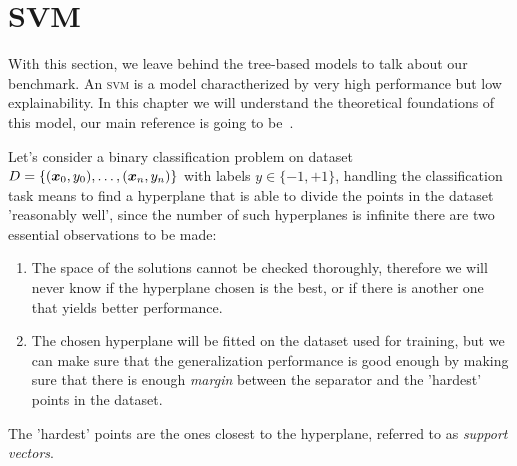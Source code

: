 \section{SVM}
\label{sec:svm}
With this section, we leave behind the tree-based models to talk about our benchmark. An
\textsc{svm} is a model charactherized by very high performance but low explainability. In this
chapter we will understand the theoretical foundations of this model, our main reference is going to be~\cite{ZhouZhi-Hua2021ML}.

\medskip

Let's consider a binary classification problem on dataset $D = \{(\boldsymbol{x}_0, y_0), \ldots, (\boldsymbol{x}_n, y_n)\}$ with labels $y \in \{-1, +1\}$,
handling the classification task means to find a hyperplane that is able to divide the points in the
dataset 'reasonably well', since the number of such hyperplanes is infinite there are two
essential observations to be made:
\begin{enumerate}
	\item The space of the solutions cannot be checked thoroughly, therefore we will never know
	      if the hyperplane chosen is the best, or if there is another one that yields better
	      performance.
	\item The chosen hyperplane will be fitted on the dataset used for training,
	      but we can make sure that the generalization performance is good enough by making
	      sure that there is enough \emph{margin} between the separator and the 'hardest'
	      points in the dataset.
\end{enumerate}
The 'hardest' points are the ones closest to the hyperplane, referred to as \emph{support
	vectors}.

\medskip

